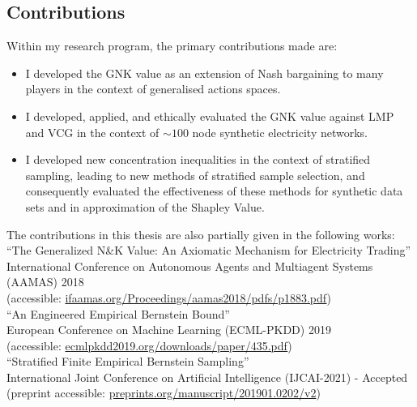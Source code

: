 \subsection{Contributions}

Within my research program, the primary contributions made are:
\begin{itemize}
\item I developed the GNK value as an extension of Nash bargaining to many players in the context of generalised actions spaces.
\item I developed, applied, and ethically evaluated the GNK value against LMP and VCG in the context of $\sim 100$ node synthetic electricity networks.
\item I developed new concentration inequalities in the context of stratified sampling, leading to new methods of stratified sample selection, and consequently evaluated the effectiveness of these methods for synthetic data sets and in approximation of the Shapley Value.
\end{itemize}

\noindent The contributions in this thesis are also partially given in the following works:\\

\noindent``The Generalized N\&K Value: An Axiomatic Mechanism for Electricity Trading''\\ International Conference on Autonomous Agents and Multiagent Systems\\ (AAMAS) 2018\\
(accessible: \href{ifaamas.org/Proceedings/aamas2018/pdfs/p1883.pdf}{ifaamas.org/Proceedings/aamas2018/pdfs/p1883.pdf})\\


\noindent``An Engineered Empirical Bernstein Bound''\\ European Conference on Machine Learning (ECML-PKDD) 2019\\
(accessible: \href{http://ecmlpkdd2019.org/downloads/paper/435.pdf}{ecmlpkdd2019.org/downloads/paper/435.pdf})\\


\noindent``Stratified Finite Empirical Bernstein Sampling''\\ International Joint Conference on Artificial Intelligence (IJCAI-2021) - Accepted\\
(preprint accessible: \href{preprints.org/manuscript/201901.0202/v2}{preprints.org/manuscript/201901.0202/v2})

